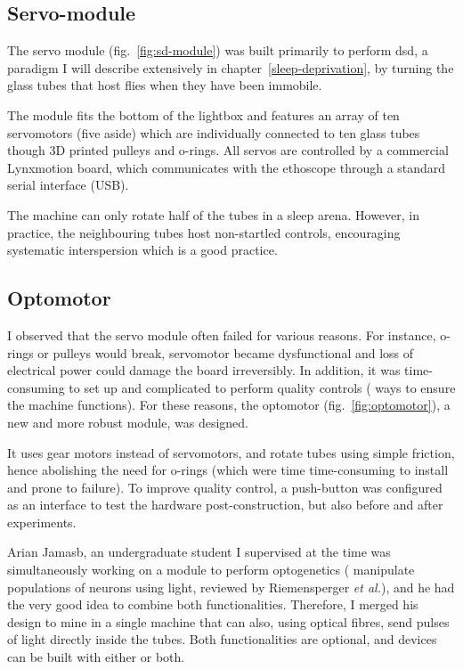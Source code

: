 \subsection{Servo-module}
\label{sec:servo-module}
The servo module (fig.~\ref{fig:sd-module}) was built primarily to perform \gls{dsd}, a paradigm I will describe extensively in chapter~\ref{sleep-deprivation}, by turning the glass tubes that host flies when they have been immobile.

The module fits the bottom of the lightbox and features an array of ten servomotors (five aside) which are individually connected to
ten glass tubes though 3D printed pulleys and o-rings.
All servos are controlled by a commercial Lynxmotion board, 
which communicates with the ethoscope through a standard serial interface (USB).

The machine can only rotate half of the tubes in a sleep arena.
However, in practice, the neighbouring tubes host non-startled controls, 
encouraging systematic interspersion\emd{} which is a good practice.




\subsection{Optomotor}
\label{sec:optomotor}
I observed that the servo module often failed for various reasons. For instance, o-rings or pulleys would break, servomotor became dysfunctional and loss of electrical power could damage the board irreversibly. 
In addition, it was time-consuming to set up and complicated to perform quality controls (\ie{} ways to ensure the machine functions).
For these reasons, the optomotor (fig.~\ref{fig:optomotor}), a new and more robust module, was designed.



It uses gear motors instead of servomotors, and rotate tubes using simple friction, hence abolishing the need for o-rings (which were time time-consuming to install and prone to failure). To improve quality control, a push-button was configured as an interface to test the hardware post-construction, but also before and after experiments.

Arian Jamasb, an undergraduate student I supervised at the time was simultaneously working on a module to perform optogenetics (\ie{} manipulate populations of neurons using light, reviewed by Riemensperger \emph{et al.}\cite{riemensperger_optogenetics_2016}), and he had the very good idea to combine both functionalities. 
Therefore, I merged his design to mine in a single machine that can also, using optical fibres, send pulses of light directly inside the tubes. 
Both functionalities are optional, and devices can be built with either or both.	

